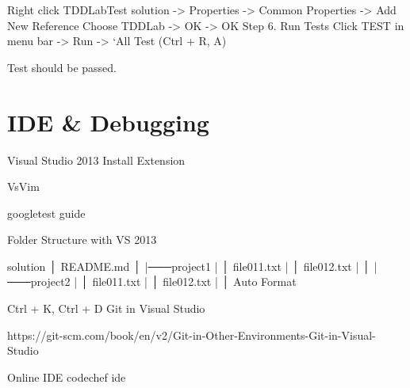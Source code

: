 Right click TDDLabTest solution -> Properties -> Common Properties -> Add New Reference
Choose TDDLab -> OK -> OK
Step 6. Run Tests
Click TEST in menu bar -> Run -> `All Test (Ctrl + R, A)

Test should be passed.

\section{IDE & Debugging}

Visual Studio 2013
Install Extension

VsVim

googletest guide

Folder Structure with VS 2013

solution
│   README.md
│
|───project1
|   │   file011.txt
|   │   file012.txt
|   │
|───project2
|   │   file011.txt
|   │   file012.txt
|   │
Auto Format

Ctrl + K, Ctrl + D
Git in Visual Studio

https://git-scm.com/book/en/v2/Git-in-Other-Environments-Git-in-Visual-Studio

Online IDE
codechef ide

